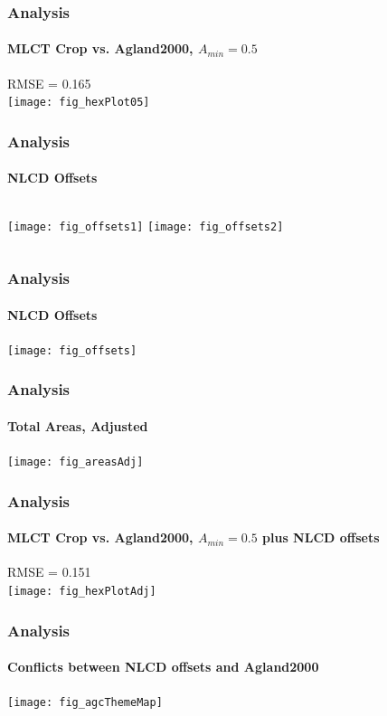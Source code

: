 \documentclass{beamer}
\begin{document}
\begin{frame}[label=hexPlot05]
  \frametitle{Analysis}
  \framesubtitle{MLCT Crop vs. Agland2000, $A_{min}=0.5$}
  \begin{center}
    RMSE = 0.165 \\
    \texttt{[image: fig\_hexPlot05]}    
  \end{center}
\end{frame}

\begin{frame}
  \frametitle{Analysis}
  \framesubtitle{NLCD Offsets}
  \begin{columns}[t]
    \column{2.5in}
    \centering
    \texttt{[image: fig\_offsets1]}
    \column{2.5in}
    \texttt{[image: fig\_offsets2]}    
  \end{columns}
\end{frame}

\begin{frame}
  \frametitle{Analysis}
  \framesubtitle{NLCD Offsets}
  \begin{center}
    \texttt{[image: fig\_offsets]}    
  \end{center}
\end{frame}

\begin{frame}
  \frametitle{Analysis}
  \framesubtitle{Total Areas, Adjusted}
  \begin{center}
    \texttt{[image: fig\_areasAdj]}    
  \end{center}
\end{frame}



\begin{frame}
  \frametitle{Analysis}
  \framesubtitle{MLCT Crop vs. Agland2000, $A_{min}=0.5$ plus NLCD offsets}
  \begin{center}
    RMSE = 0.151 \\
    \texttt{[image: fig\_hexPlotAdj]}    
  \end{center}
\end{frame}

\begin{frame}
  \frametitle{Analysis}
  \framesubtitle{Conflicts between NLCD offsets and Agland2000}
  \begin{center}
    \texttt{[image: fig\_agcThemeMap]}    
  \end{center}
\end{frame}
\end{document}
